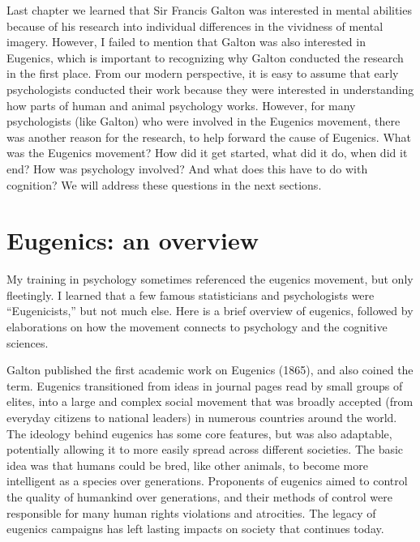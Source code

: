 \documentclass[
  oneside,
  12pt]{crumpbook}
\begin{document}
Last chapter we learned that Sir Francis Galton was interested in mental abilities because of his research into individual differences in the vividness of mental imagery. However, I failed to mention that Galton was also interested in Eugenics, which is important to recognizing why Galton conducted the research in the first place. From our modern perspective, it is easy to assume that early psychologists conducted their work because they were interested in understanding how parts of human and animal psychology works. However, for many psychologists (like Galton) who were involved in the Eugenics movement, there was another reason for the research, to help forward the cause of Eugenics. What was the Eugenics movement? How did it get started, what did it do, when did it end? How was psychology involved? And what does this have to do with cognition? We will address these questions in the next sections.

\hypertarget{eugenics-an-overview}{%
\section{Eugenics: an overview}\label{eugenics-an-overview}}

My training in psychology sometimes referenced the eugenics movement, but only fleetingly. I learned that a few famous statisticians and psychologists were ``Eugenicists,'' but not much else. Here is a brief overview of eugenics, followed by elaborations on how the movement connects to psychology and the cognitive sciences.

Galton published the first academic work on Eugenics (1865), and also coined the term. Eugenics transitioned from ideas in journal pages read by small groups of elites, into a large and complex social movement that was broadly accepted (from everyday citizens to national leaders) in numerous countries around the world. The ideology behind eugenics has some core features, but was also adaptable, potentially allowing it to more easily spread across different societies. The basic idea was that humans could be bred, like other animals, to become more intelligent as a species over generations. Proponents of eugenics aimed to control the quality of humankind over generations, and their methods of control were responsible for many human rights violations and atrocities. The legacy of eugenics campaigns has left lasting impacts on society that continues today.
\end{document}
